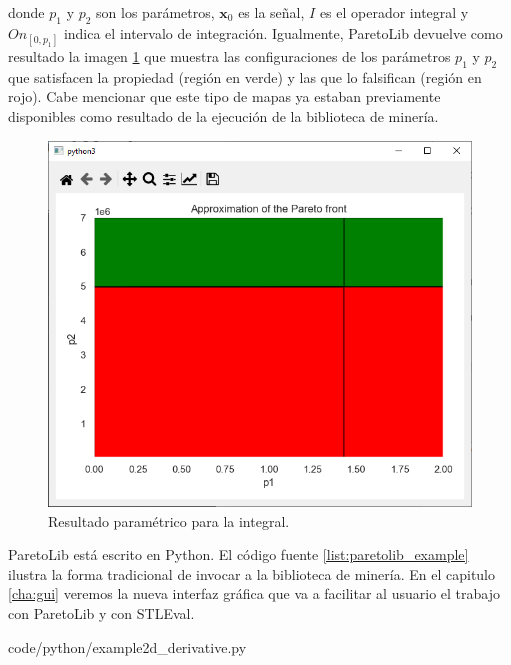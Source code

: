 donde $p_1$ y $p_2$ son los parámetros, $\mathbf{x}_0$ es la señal, $I$ es el operador integral y $On_{[0,p_1]}$ indica el intervalo de integración.
Igualmente, ParetoLib devuelve como resultado la imagen \ref{fig:param_integral} que muestra las configuraciones de los parámetros $p_1$ y $p_2$ que satisfacen la propiedad (región en verde) y las que lo falsifican (región en rojo). 
Cabe mencionar que este tipo de mapas ya estaban previamente disponibles como resultado de la ejecución de la biblioteca de minería.

\begin{figure}[htb]
\centering
  \includegraphics[width=0.7\linewidth]{images/stl_parametrico_int} 
\caption{Resultado paramétrico para la integral.}
\label{fig:param_integral}
\end{figure}

ParetoLib está escrito en Python. %
El código fuente \ref{list:paretolib_example} ilustra la forma tradicional de invocar a la biblioteca de minería. En el capitulo \ref{cha:gui} veremos la nueva interfaz gráfica que va a facilitar al usuario el trabajo con ParetoLib y con STLEval.



		{code/python/example2d_derivative.py}
